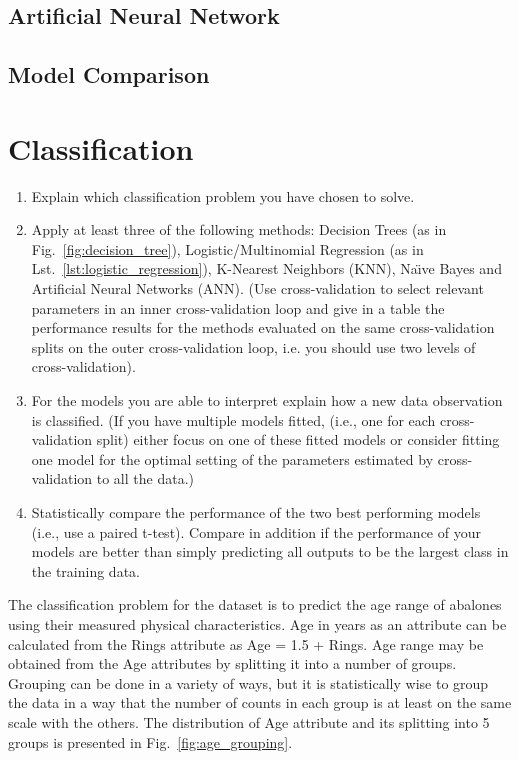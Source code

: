 \documentclass[10pt, paper=a4]{article}
\begin{document}
\subsection{Artificial Neural Network}

\subsection{Model Comparison}
\section{Classification}
\label{sec:classification}

\begin{enumerate}
\item Explain which classification problem you have chosen to solve.
\item Apply at least three of the following methods: Decision Trees
  (as in Fig.~\ref{fig:decision_tree}), Logistic/Multinomial
  Regression (as in Lst.~\ref{lst:logistic_regression}), K-Nearest
  Neighbors (KNN), Naı̈ve Bayes and Artificial Neural Networks (ANN).
  (Use cross-validation to select relevant parameters in an inner
  cross-validation loop and give in a table the performance results
  for the methods evaluated on the same cross-validation splits on the
  outer cross-validation loop, i.e. you should use two levels of
  cross-validation).
\item For the models you are able to interpret explain how a new data
  observation is classified.  (If you have multiple models fitted,
  (i.e., one for each cross-validation split) either focus on one of
  these fitted models or consider fitting one model for the optimal
  setting of the parameters estimated by cross-validation to all the
  data.)
\item Statistically compare the performance of the two best performing
  models (i.e., use a paired t-test). Compare in addition if the
  performance of your models are better than simply predicting all
  outputs to be the largest class in the training data.
\end{enumerate}


The classification problem for the dataset is to predict the age range
of abalones using their measured physical characteristics.  Age in
years as an attribute can be calculated from the Rings attribute as
Age = 1.5 + Rings.  Age range may be obtained from the Age attributes
by splitting it into a number of groups.  Grouping can be done in a
variety of ways, but it is statistically wise to group the data in a
way that the number of counts in each group is at least on the same
scale with the others.  The distribution of Age attribute and its
splitting into 5 groups is presented in Fig.~\ref{fig:age_grouping}.
\end{document}
